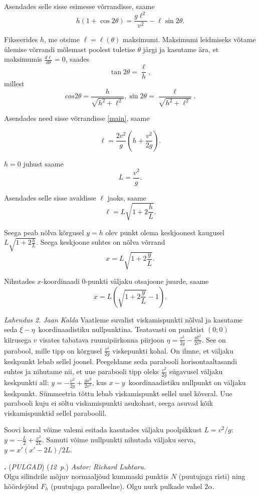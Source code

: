 \documentclass[11pt,a5paper]{article}
\newcommand{\numb}[1]{\vspace{5pt}\textbf{\large #1}}
\newcommand{\nimi}[1]{(\textsl{\small #1})}
\newcommand{\punktid}[1]{(\emph{#1~p.})}
\newcounter{ylesanne}
\newcommand{\yl}[1]{\addtocounter{ylesanne}{1}\numb{\theylesanne.} \nimi{#1} \newblock{}}
\newcommand{\autor}[1]{\emph{ Autor: #1.\\}}
\begin{document}
Asendades selle sisse esimesse võrrandisse, saame
\begin{equation}\label{main}
    h(1+\cos 2\theta)=\frac{g\ell^2}{v^2}-\ell\sin 2\theta.
\end{equation}

Fikseerides $h$, me otsime $\ell=\ell(\theta)$ maksimumi. Maksimumi leidmiseks võtame ülemise võrrandi mõlemast poolest tuletise $\theta$ järgi ja kasutame ära, et maksimumis $\frac{d\ell}{d\theta}=0$, saades
\[\tan 2\theta=\frac{\ell}{h},\]
millest
\[cos2\theta=\frac{h}{\sqrt{h^2+\ell^2}}, \sin 2\theta=\frac{\ell}{\sqrt{h^2+\ell^2}}.\]

Asendades need sisse võrrandisse \ref{main}, saame

\[\ell=\frac{2v^2}{g}\left(h+\frac{v^2}{2g}\right).\]

$h=0$ juhust saame
\[L=\frac{v^2}{g}.\]

Asendades selle sisse avaldisse $\ell$ jaoks, saame
\[\ell=L\sqrt{1+2\frac{h}{L}}.\]

Seega peab nõlva kõrgusel $y=h$ olev punkt olema keskjoonest kaugusel $L\sqrt{1+2\frac{h}{L}}$. Seega keskjoone suhtes on nõlva võrrand
\[x=L\sqrt{1+2\frac{y}{L}}.\]

Nihutades $x$-koordinaadi $0$-punkti väljaku otsajoone juurde, saame
\[x=L\left(\sqrt{1+2\frac{y}{L}}-1\right).\]

\emph{Lahendus 2.}
\emph{Jaan Kalda}
Vaatleme suvalist viskamispunkti nõlval ja kasutame seda $\xi-\eta$~koordinaadistiku nullpunktina. Teatavasti on punktist $(0;0)$ kiirusega $v$ visates tabatava ruumipiirkonna piirjoon $\eta=\frac{v^2}{2g}-\frac{g\xi^2}{2v^2}$. See on parabool, mille tipp on kõrgusel $\frac{v^2}{2g}$ viskepunkti kohal. On ilmne, et väljaku keskpunkt lebab sellel joonel. Peegeldame seda parabooli horisontaaltasandi suhtes ja nihutame nii, et uue parabooli tipp oleks $\frac{v^2}{2g}$ sügavusel väljaku keskpunkti all: $y=-\frac{v^2}{2g}+\frac{gx^2}{2v^2}$, kus  $x-y$~koordinaadistiku nullpunkt on väljaku keskpunkt. Sümmeetria tõttu lebab viskamispunkt sellel uuel kõveral. Uue parabooli kuju ei sõltu viskamispunkti asukohast, seega asuvad kõik viskamispunktid sellel paraboolil.

Soovi korral võime valemi esitada kasutades väljaku poolpikkust $L=v^2/g$: $y=-\frac L2+\frac{x^2}{2L}$. Samuti võime nullpunkti nihutada väljaku serva, $y=x'(x'-2L)/2L$.


\yl{PULGAD}
\punktid{12}
\autor{Richard Luhtaru}
\osa Olgu silindrile mõjuv normaaljõud kummaski punktis $N$ (puutujaga risti) ning hõõrdejõud $F_h$ (puutujaga paralleelne). Olgu nurk pulkade vahel $2\alpha$.
\end{document}
